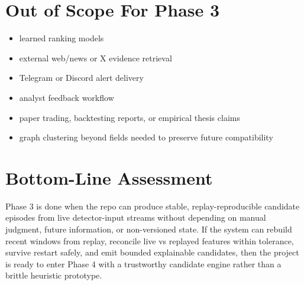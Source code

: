 \documentclass{article}
\begin{document}
\section*{Out of Scope For Phase 3}
\begin{itemize}
\item learned ranking models
\item external web/news or X evidence retrieval
\item Telegram or Discord alert delivery
\item analyst feedback workflow
\item paper trading, backtesting reports, or empirical thesis claims
\item graph clustering beyond fields needed to preserve future compatibility
\end{itemize}

\section*{Bottom-Line Assessment}
Phase 3 is done when the repo can produce stable, replay-reproducible candidate episodes from live detector-input streams without depending on manual judgment, future information, or non-versioned state. If the system can rebuild recent windows from replay, reconcile live vs replayed features within tolerance, survive restart safely, and emit bounded explainable candidates, then the project is ready to enter Phase 4 with a trustworthy candidate engine rather than a brittle heuristic prototype.
\end{document}
